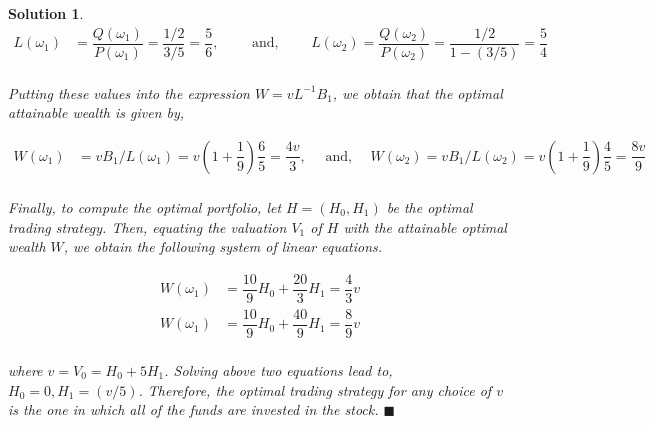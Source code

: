 \documentclass[12pt]{article}
\theoremstyle{problemstyle}
\newtheorem*{solution*}{Solution}
\begin{document}
\begin{solution*}
\begin{align*}
    L(\omega_1) & = \dfrac{Q(\omega_1)}{P(\omega_1)} = \dfrac{1/2}{3/5} = \dfrac{5}{6}, \qquad \text{ and, } \qquad L(\omega_2) = \dfrac{Q(\omega_2)}{P(\omega_2)} = \dfrac{1/2}{1 - (3/5)} = \dfrac{5}{4}\\
\end{align*}

Putting these values into the expression $W = v L^{-1} B_1$, we obtain that the optimal attainable wealth is given by,

\begin{align*}
    W(\omega_1) & = v B_1 / L(\omega_1) = v \left( 1 + \dfrac{1}{9}\right) \dfrac{6}{5} =  \dfrac{4v}{3}
    , \quad \text{ and, } \quad W(\omega_2) = v B_1 / L(\omega_2) = v \left( 1 + \dfrac{1}{9}\right) \dfrac{4}{5} =  \dfrac{8v}{9}\\
\end{align*}

Finally, to compute the optimal portfolio, let $H = (H_0, H_1)$ be the optimal trading strategy. Then, equating the valuation $V_1$ of $H$ with the attainable optimal wealth $W$, we obtain the following system of linear equations. 

\begin{align*}
    W(\omega_1) & = \dfrac{10}{9} H_0 + \dfrac{20}{3} H_1 = \dfrac{4}{3}v\\
    W(\omega_1) & = \dfrac{10}{9} H_0 + \dfrac{40}{9} H_1 = \dfrac{8}{9}v\\
\end{align*}

where $v = V_0 = H_0 + 5H_1$. Solving above two equations lead to, $H_0 = 0, H_1 = (v/5)$. Therefore, the optimal trading strategy for any choice of $v$ is the one in which all of the funds are invested in the stock. \hfill $\blacksquare$


\end{solution*}

\newpage 
\end{document}
